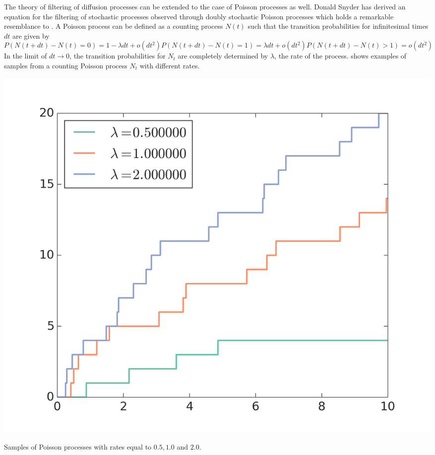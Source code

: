 The theory of filtering of diffusion processes can be extended to the case of Poisson processes as well. Donald Snyder has derived an equation for the filtering of stochastic processes observed through doubly stochastic Poisson processes which holds a remarkable resemblance to .\cite{Snyder1972} A Poisson process can be defined as a counting process $N(t)$ such that the transition probabilities for infinitesimal times $dt$ are given by
\begin{subequations}
\begin{equation}
P(N({t+dt})-N(t) = 0 ) = 1 -\lambda dt + o(dt^2)
\end{equation}
\begin{equation}
P(N(t+dt)-N(t) = 1) = \lambda dt + o(dt^2)
\end{equation}
\begin{equation}
P(N(t+dt)-N(t)>1) = o(dt^2)
\end{equation}
\end{subequations}
In the limit of $dt\to 0$, the transition probabilities for $N_t$ are completely determined by $\lambda$, the rate of the process.  shows examples of samples from a counting Poisson process $N_t$ with different rates.
\begin{marginfigure}
\includegraphics[width=\columnwidth]{figures/figure_2_1.png}
\caption{Samples of Poisson processes with rates equal to $0.5, 1.0$ and $2.0$.}
\label{fig:poisson_example}
\end{marginfigure}
\par
